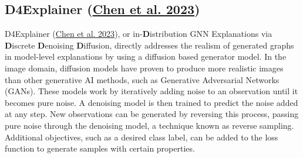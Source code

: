 \documentclass[
  11pt,
  letterpaper,
]{article}
\begin{document}
\hypertarget{d4explainer-chen_wu_gupta_ying_2023}{%
\subsection{\texorpdfstring{D4Explainer
(\protect\hyperlink{ref-Chen_Wu_Gupta_Ying_2023}{Chen et al.
2023})}{D4Explainer (Chen et al. 2023)}}\label{d4explainer-chen_wu_gupta_ying_2023}}

\quad D4Explainer (\protect\hyperlink{ref-Chen_Wu_Gupta_Ying_2023}{Chen
et al. 2023}), or in-\textbf{D}istribution GNN Explanations via
\textbf{D}iscrete \textbf{D}enoising \textbf{D}iffusion, directly
addresses the realism of generated graphs in model-level explanations by
using a diffusion based generator model. In the image domain, diffusion
models have proven to produce more realistic images than other
generative AI methods, such as Generative Adversarial Networks (GANs).
These models work by iteratively adding noise to an observation until it
becomes pure noise. A denoising model is then trained to predict the
noise added at any step. New observations can be generated by reversing
this process, passing pure noise through the denoising model, a
technique known as reverse sampling. Additional objectives, such as a
desired class label, can be added to the loss function to generate
samples with certain properties.
\end{document}
